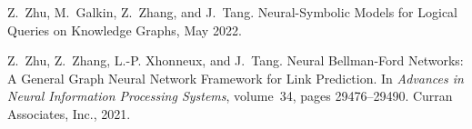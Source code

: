 \documentclass[11pt]{article}
\begin{document}
\begin{thebibliography}{10}
\begin{small}
Z.~Zhu, M.~Galkin, Z.~Zhang, and J.~Tang.
\newblock Neural-{{Symbolic Models}} for {{Logical Queries}} on {{Knowledge
		Graphs}}, May 2022.

Z.~Zhu, Z.~Zhang, L.-P. Xhonneux, and J.~Tang.
\newblock Neural {{Bellman-Ford Networks}}: {{A General Graph Neural Network
		Framework}} for {{Link Prediction}}.
\newblock In {\em Advances in {{Neural Information Processing Systems}}},
volume~34, pages 29476--29490. {Curran Associates, Inc.}, 2021.


\end{small}
\end{thebibliography}
\end{document}
